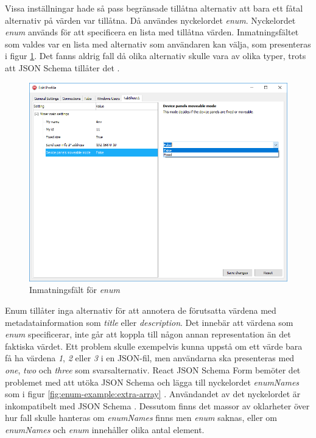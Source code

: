 Vissa inställningar hade så pass begränsade tillåtna alternativ att bara ett fåtal alternativ på värden var tillåtna. Då användes nyckelordet \textit{enum}. Nyckelordet \textit{enum} används för att specificera en lista med tillåtna värden. Inmatningsfältet som valdes var en lista med alternativ som användaren kan välja, som presenteras i figur \ref{fig:enum}. Det fanns aldrig fall då olika alternativ skulle vara av olika typer, trots att JSON Schema tillåter det \cite[s.~9]{Andrews2018}.

\begin{figure}
	\includegraphics[width=\textwidth]{./images/gui/enum.png}
	\vspace{-1.7em}
	\caption{Inmatningsfält för \textit{enum}}
	\label{fig:enum}
\end{figure}

Enum tillåter inga alternativ för att annotera de förutsatta värdena med metadatainformation som \textit{title} eller \textit{description}. Det innebär att värdena som \textit{enum} specificerar, inte går att koppla till någon annan representation än det faktiska värdet. Ett problem skulle exempelvis kunna uppstå om ett värde bara få ha värdena \textit{1}, \textit{2} eller \textit{3} i en JSON-fil, men användarna ska presenteras med \textit{one}, \textit{two} och \textit{three} som svarsalternativ. React JSON Schema Form bemöter det problemet med att utöka JSON Schema och lägga till nyckelordet \textit{enumNames} som i figur \ref{fig:enum-example:extra-array} \cite{MozillaServices}. Användandet av det nyckelordet är inkompatibelt med JSON Schema \cite{Andrews2018}. Dessutom finns det massor av oklarheter över hur fall skulle hanteras om \textit{enumNames} finns men \textit{enum} saknas, eller om \textit{enumNames} och \textit{enum} innehåller olika antal element.

